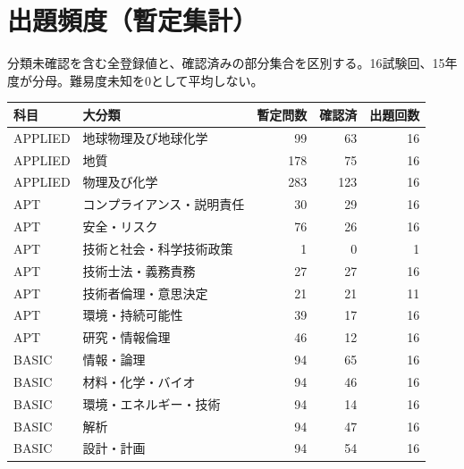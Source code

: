 \chapter{出題頻度（暫定集計）}
分類未確認を含む全登録値と、確認済みの部分集合を区別する。16試験回、15年度が分母。難易度未知を0として平均しない。
\begin{longtable}{p{.16\linewidth}p{.42\linewidth}rrr}
科目 & 大分類 & 暫定問数 & 確認済 & 出題回数\\\hline
APPLIED & 地球物理及び地球化学 & 99 & 63 & 16\\
APPLIED & 地質 & 178 & 75 & 16\\
APPLIED & 物理及び化学 & 283 & 123 & 16\\
APT & コンプライアンス・説明責任 & 30 & 29 & 16\\
APT & 安全・リスク & 76 & 26 & 16\\
APT & 技術と社会・科学技術政策 & 1 & 0 & 1\\
APT & 技術士法・義務責務 & 27 & 27 & 16\\
APT & 技術者倫理・意思決定 & 21 & 21 & 11\\
APT & 環境・持続可能性 & 39 & 17 & 16\\
APT & 研究・情報倫理 & 46 & 12 & 16\\
BASIC & 情報・論理 & 94 & 65 & 16\\
BASIC & 材料・化学・バイオ & 94 & 46 & 16\\
BASIC & 環境・エネルギー・技術 & 94 & 14 & 16\\
BASIC & 解析 & 94 & 47 & 16\\
BASIC & 設計・計画 & 94 & 54 & 16\\
\end{longtable}
